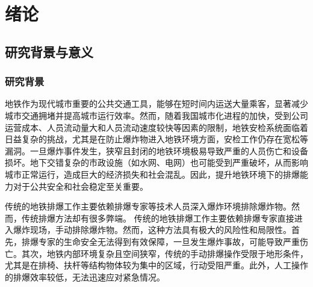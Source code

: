 \chapter{绪论}

\section{研究背景与意义}


\subsection{研究背景}
地铁作为现代城市重要的公共交通工具，能够在短时间内运送大量乘客，显著减少城市交通拥堵并提高城市运行效率。然而，随着我国城市化进程的加快，受到公司运营成本、人员流动量大和人员流动速度较快等因素的限制，地铁安检系统面临着日益复杂的挑战，尤其是在防止爆炸物进入地铁环境方面，安检工作仍存在宽松等漏洞。一旦爆炸事件发生，狭窄且封闭的地铁环境极易导致严重的人员伤亡和设备损坏。地下交错复杂的市政设施（如水网、电网）也可能受到严重破坏，从而影响城市正常运行，造成巨大的经济损失和社会混乱。因此，提升地铁环境下的排爆能力对于公共安全和社会稳定至关重要。

传统的地铁排爆工作主要依赖排爆专家等技术人员深入爆炸环境排除爆炸物。然而，传统排爆方法却有很多弊端。
传统的地铁排爆工作主要依赖排爆专家直接进入爆炸现场，手动排除爆炸物。然而，这种方法具有极大的风险性和局限性。首先，排爆专家的生命安全无法得到有效保障，一旦发生爆炸事故，可能导致严重伤亡。其次，地铁内部环境复杂且空间狭窄，传统的手动排爆操作受限于地形条件，尤其是在排椅、扶杆等结构物体较为集中的区域，行动受阻严重。此外，人工操作的排爆效率较低，无法迅速应对紧急情况。

